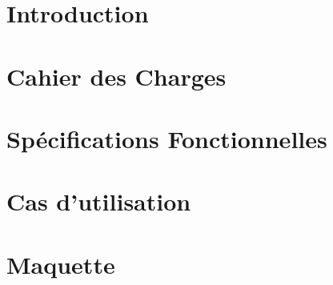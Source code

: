 \documentclass[asi]{documentLong}
\begin{document}
\couverture{}

\informationsGenerales{}


\label{chap:pageDeService}
\tableofcontents{}

\newpage

\chapter{Introduction}
 

\chapter{Cahier des Charges}


\chapter{Spécifications Fonctionnelles}
 

\chapter{Cas d'utilisation}
 

\chapter{Maquette}





~\newpage ~
\pageQuatriemeCouverture{}
\end{document}
